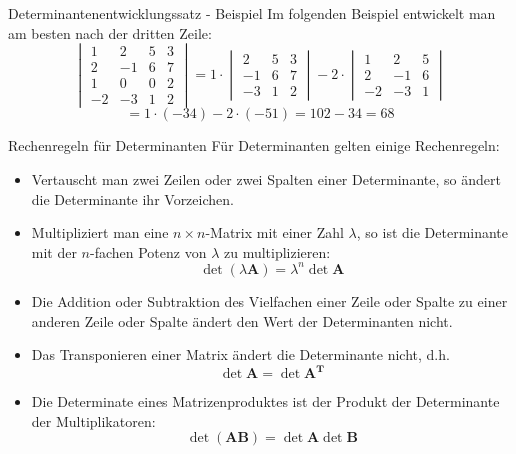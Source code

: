 \begin{frame}{Determinantenentwicklungssatz - Beispiel}
	Im folgenden Beispiel entwickelt man am besten nach der dritten Zeile:
	\[
	\begin{vmatrix}
	1 & 2 & 5 & 3 \\
	2 & -1 & 6 & 7 \\
	1 & 0 & 0 & 2 \\
	-2 & -3 & 1 & 2
	\end{vmatrix} = 1 \cdot \begin{vmatrix}
	2 & 5 & 3 \\
	-1 & 6 & 7 \\
	-3 & 1 & 2
	\end{vmatrix} - 2 \cdot \begin{vmatrix}
	1 & 2 & 5 \\
	2 & -1 & 6 \\
	-2 & -3 & 1
	\end{vmatrix}
	\]
	\[
	 = 1\cdot(-34) -2\cdot(-51) = 102 - 34 = 68 \]
\end{frame}

\begin{frame}{Rechenregeln für Determinanten}
	Für Determinanten gelten einige Rechenregeln:
	\begin{itemize}
		\item Vertauscht man zwei Zeilen oder zwei Spalten einer Determinante, so ändert die Determinante ihr Vorzeichen.
		\item Multipliziert man eine $n \times n$-Matrix mit einer Zahl $\lambda$, so ist die Determinante mit der $n$-fachen Potenz von $\lambda$ zu multiplizieren:
		\[
		\det \left( \lambda \pmb{A} \right) = \lambda^{n} \det \pmb{A}
		\]
		\item Die Addition oder Subtraktion des Vielfachen einer Zeile oder Spalte zu einer anderen Zeile oder Spalte ändert den Wert der Determinanten nicht.
		\item Das Transponieren einer Matrix ändert die Determinante nicht, d.h.
		\[
		\det \pmb{A} = \det \pmb{A^{T}}
		\]
		\item Die Determinate eines Matrizenproduktes ist der Produkt der Determinante der Multiplikatoren:
		\[
		\det \left(\pmb{A} \pmb{B}\right) = \det \pmb{A} \det \pmb{B}
		\]
	\end{itemize}
\end{frame}

